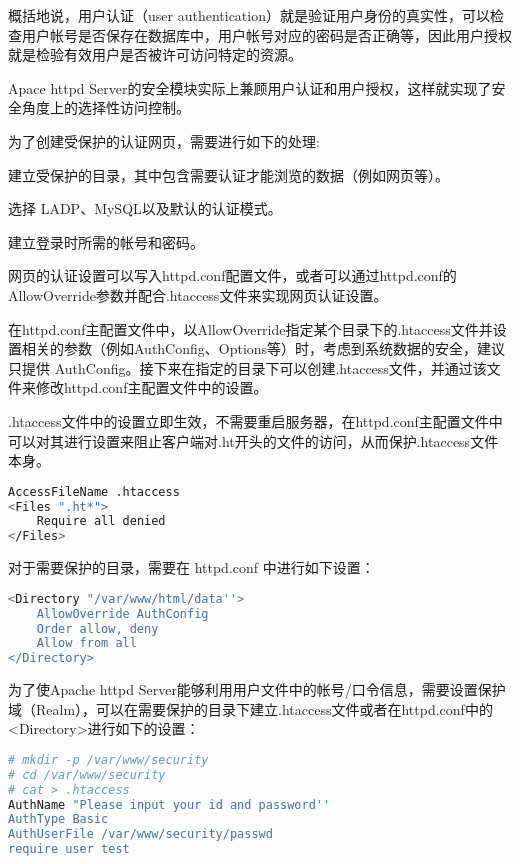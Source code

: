 概括地说，用户认证（user authentication）就是验证用户身份的真实性，可以检查用户帐号是否保存在数据库中，用户帐号对应的密码是否正确等，因此用户授权就是检验有效用户是否被许可访问特定的资源。

Apace httpd Server的安全模块实际上兼顾用户认证和用户授权，这样就实现了安全角度上的选择性访问控制。

为了创建受保护的认证网页，需要进行如下的处理:

\begin{compactitem}
\item 建立受保护的目录，其中包含需要认证才能浏览的数据（例如网页等）。
\item 选择 LADP、MySQL以及默认的认证模式。
\item 建立登录时所需的帐号和密码。
\end{compactitem}

网页的认证设置可以写入httpd.conf配置文件，或者可以通过httpd.conf的AllowOverride参数并配合.htaccess文件来实现网页认证设置。

在httpd.conf主配置文件中，以AllowOverride指定某个目录下的.htaccess文件并设置相关的参数（例如AuthConfig、Options等）时，考虑到系统数据的安全，建议只提供 AuthConfig。接下来在指定的目录下可以创建.htaccess文件，并通过该文件来修改httpd.conf主配置文件中的设置。


.htaccess文件中的设置立即生效，不需要重启服务器，在httpd.conf主配置文件中可以对其进行设置来阻止客户端对.ht开头的文件的访问，从而保护.htaccess文件本身。

\begin{lstlisting}[language=bash]
AccessFileName .htaccess
<Files ".ht*">
	Require all denied
</Files>
\end{lstlisting}

对于需要保护的目录，需要在 httpd.conf 中进行如下设置：


\begin{lstlisting}[language=bash]
<Directory "/var/www/html/data''>
	AllowOverride AuthConfig
	Order allow, deny
	Allow from all
</Directory>
\end{lstlisting}

为了使Apache httpd Server能够利用用户文件中的帐号/口令信息，需要设置保护域（Realm），可以在需要保护的目录下建立.htaccess文件或者在httpd.conf中的<Directory>进行如下的设置：


\begin{lstlisting}[language=bash]
# mkdir -p /var/www/security
# cd /var/www/security
# cat > .htaccess
AuthName "Please input your id and password''
AuthType Basic
AuthUserFile /var/www/security/passwd
require user test
\end{lstlisting}

